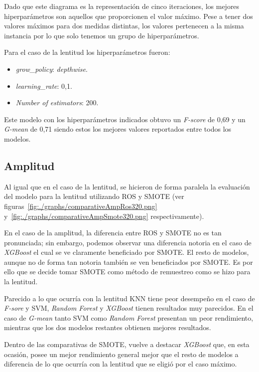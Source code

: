 Dado que este diagrama es la representación de cinco iteraciones, los mejores hiperparámetros son aquellos que proporcionen el valor máximo. Pese a tener dos valores máximos para dos medidas distintas, los valores pertenecen a la misma instancia por lo que solo tenemos un grupo de hiperparámetros.

Para el caso de la lentitud los hiperparámetros fueron:
\begin{itemize}
\item \textit{grow\_policy}: \textit{depthwise}.
\item \textit{learning\_rate}: 0,1.
\item \textit{Number of estimators}: 200.
\end{itemize}
Este modelo con los hiperparámetros indicados obtuvo un \textit{F-score} de 0,69 y un \textit{G-mean} de 0,71 siendo estos los mejores valores reportados entre todos los modelos.

\subsection{Amplitud}

Al igual que en el caso de la lentitud,  se hicieron de forma paralela la evaluación del modelo para la lentitud utilizando ROS y SMOTE (ver figuras~\ref{fig:./graphs/comparativeAmpRos320.png} y~\ref{fig:./graphs/comparativeAmpSmote320.png} respectivamente).

En el caso de la amplitud, la diferencia entre ROS y SMOTE no es tan pronunciada; sin embargo, podemos observar una diferencia notoria en el caso de \textit{XGBoost} el cual se ve claramente beneficiado por SMOTE. El resto de modelos, aunque no de forma tan notoria también se ven beneficiados por SMOTE. Es por ello que se decide tomar SMOTE como método de remuestreo como se hizo para la lentitud. 

Parecido a lo que ocurría con la lentitud KNN tiene peor desempeño en el caso de \textit{F-sore} y SVM, \textit{Random Forest} y \textit{XGBoost} tienen resultados muy parecidos. En el caso de \textit{G-mean} tanto SVM como \textit{Random Forest} presentan un peor rendimiento, mientras que los dos modelos restantes obtienen mejores resultados.

Dentro de las comparativas de SMOTE, vuelve a destacar \textit{XGBoost} que, en esta ocasión, posee un mejor rendimiento general mejor que el resto de modelos a diferencia de lo que ocurría con la lentitud que se eligió por el caso máximo. 

